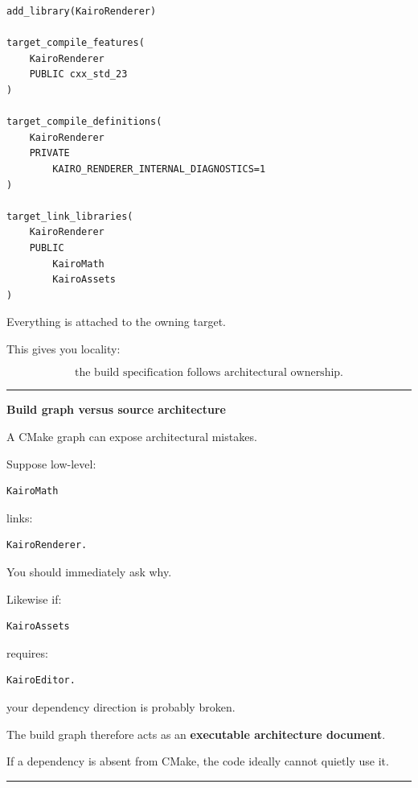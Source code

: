 \begin{verbatim}
add_library(KairoRenderer)

target_compile_features(
    KairoRenderer
    PUBLIC cxx_std_23
)

target_compile_definitions(
    KairoRenderer
    PRIVATE
        KAIRO_RENDERER_INTERNAL_DIAGNOSTICS=1
)

target_link_libraries(
    KairoRenderer
    PUBLIC
        KairoMath
        KairoAssets
)
\end{verbatim}

Everything is attached to the owning target.

This gives you locality:

\[
\boxed{
\text{the build specification follows architectural ownership}.
}
\]

\begin{center}\rule{0.5\linewidth}{0.5pt}\end{center}

\textbf{Build graph versus source architecture}

A CMake graph can expose architectural mistakes.

Suppose low-level:

\begin{verbatim}
KairoMath
\end{verbatim}

links:

\begin{verbatim}
KairoRenderer.
\end{verbatim}

You should immediately ask why.

Likewise if:

\begin{verbatim}
KairoAssets
\end{verbatim}

requires:

\begin{verbatim}
KairoEditor.
\end{verbatim}

your dependency direction is probably broken.

The build graph therefore acts as an \textbf{executable architecture document}.

If a dependency is absent from CMake, the code ideally cannot quietly use it.

\begin{center}\rule{0.5\linewidth}{0.5pt}\end{center}

